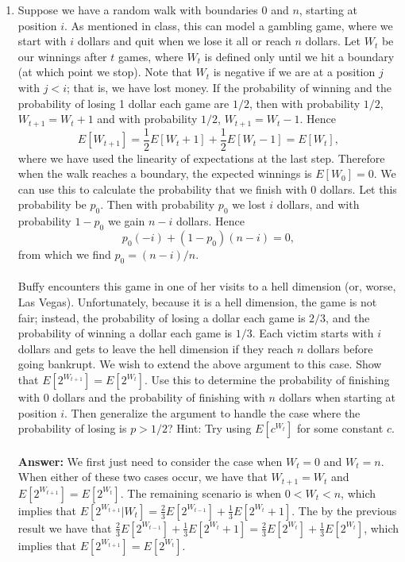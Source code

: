 \documentclass[tikz, 12pt]{scrartcl}
\begin{document}
\begin{enumerate}
	\item Suppose we have a random walk with boundaries 0 and $n$, starting at position $i$. As mentioned in class, this can model a gambling game, where we start with $i$ dollars and quit when we lose it all or reach $n$ dollars. Let $W_t$ be our winnings after $t$ games, where $W_t$ is defined only until we hit a boundary (at which point we stop). Note that $W_t$ is negative if we are at a position $j$ with $j < i$; that is, we have lost money. If the probability of winning and the probability of losing 1 dollar each game are $1/2$, then with probability $1/2$, $W_{t + 1} = W_t + 1$ and with probability $1/2$, $W_{t+1} = W_t - 1$. Hence
	\begin{equation}
	E[W_{t + 1}] = \frac{1}{2} E[W_{t} + 1] + \frac{1}{2}E[W_{t} - 1] = E[W_{t}],
	\end{equation}
	where we have used the linearity of expectations at the last step. Therefore when the walk reaches a boundary, the expected winnings is $E[W_0] = 0$. We can use this to calculate the probability that we finish with 0 dollars. Let this probability be $p_0$. Then with probability $p_0$ we lost $i$ dollars, and with probability $1 - p_0$ we gain $n - i$ dollars. Hence
	\begin{equation}
	p_0(-i) + (1 - p_0)(n - i) = 0,
	\end{equation}
	from which we find $p_0  = (n - i) / n$.\\
	\\
	Buffy encounters this game in one of her visits to a hell dimension (or, worse, Las Vegas). Unfortunately, because it is a hell dimension, the game is not fair; instead, the probability of losing a dollar each game is $2/3$, and the probability of winning a dollar each game is $1/3$. Each victim starts with $i$ dollars and gets to leave the hell dimension if they reach $n$ dollars before going bankrupt. We wish to extend the above argument to this case. Show that $E[2^{W_{t+1}}] = E[2^{W_t}]$. Use this to determine the probability of finishing with 0 dollars and the probability of finishing with $n$ dollars when starting at position $i$. Then generalize the argument to handle the case where the probability of losing is $p > 1/2$? Hint: Try using $E[c^{W_t}]$ for some constant $c$.\\
\\
\textbf{Answer:} We first just need to consider the case when $W_t = 0$ and $W_t = n$. When either of these two cases occur,  we have that $W_{t+1} = W_t$ and $E[2^{W_{t+1}}] = E[2^{W_t}]$. The remaining scenario is when $0 < W_t < n$, which implies that $E[2^{W_{t+1}}| W_t] = \frac{2}{3}E[2^{W_{t-1}}]+\frac{1}{3}E[2^{W_t} + 1]$. The by the previous result we have that $ \frac{2}{3}E[2^{W_{t-1}}]+\frac{1}{3}E[2^{W_t} + 1] = \frac{2}{3}E[2^{W_t}] + \frac{1}{3}E[2^{W_t}]$, which implies that $E[2^{W_{t+1}}] = E[2^{W_t}]$.\\

\end{enumerate}
\end{document}
